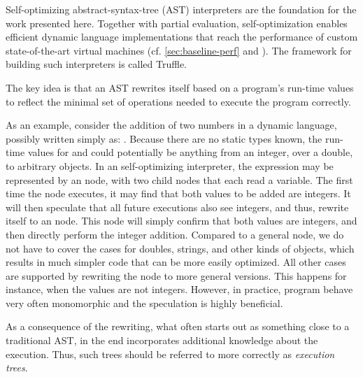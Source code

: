 Self-optimizing abstract-syntax-tree (AST) interpreters\citep{Wurthinger:2012:SelfOptAST}
are the foundation for the work presented here.
Together with partial evaluation\citep{Wurthinger:2017:PPE},
self-optimization enables efficient dynamic language implementations
that reach the performance of custom state-of-the-art virtual machines
(cf. \cref{sec:baseline-perf} and \citep{Marr:2015:MTPE}).
The framework for building such interpreters is called Truffle.

The key idea is that an AST rewrites itself based on a program's run-time values
to reflect the minimal set of operations needed to execute the program correctly.

As an example, consider the addition of two numbers in a dynamic language,
possibly written simply as: .
Because there are no static types known,
the run-time values for  and  could potentially be anything
from an integer, over a double, to arbitrary objects.
In an self-optimizing interpreter, the expression may be represented by
an  node, with two child nodes that each read a variable.
The first time the  node executes,
it may find that both values to be added are integers.
It will then speculate that all future executions
also see integers, and thus, rewrite itself to an  node.
This  node will simply confirm that both values are integers,
and then directly perform the integer addition.
Compared to a general  node,
we do not have to cover the cases for doubles, strings, and other kinds of objects,
which results in much simpler code that can be more easily optimized.
All other cases are supported by rewriting the  node to more general
versions.
This happens for instance, when the values are not integers.
However, in practice, program behave very often monomorphic and
the speculation is highly beneficial.

As a consequence of the rewriting,
what often starts out as something close to a traditional AST,
in the end incorporates additional knowledge about the execution.
Thus, such trees should be referred to more correctly as \emph{execution trees}.

